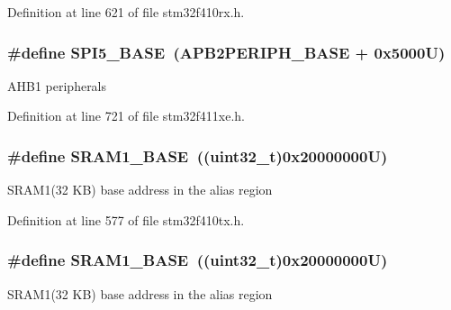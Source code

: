 Definition at line 621 of file stm32f410rx.\+h.

\subsubsection[{\texorpdfstring{S\+P\+I5\+\_\+\+B\+A\+SE}{SPI5_BASE}}]{\setlength{\rightskip}{0pt plus 5cm}\#define S\+P\+I5\+\_\+\+B\+A\+SE~({\bf A\+P\+B2\+P\+E\+R\+I\+P\+H\+\_\+\+B\+A\+SE} + 0x5000\+U)}\hypertarget{group___peripheral__registers__structures_gac1c58d33414e167d478ecd0e31331dfa}{}\label{group___peripheral__registers__structures_gac1c58d33414e167d478ecd0e31331dfa}
A\+H\+B1 peripherals 

Definition at line 721 of file stm32f411xe.\+h.

\subsubsection[{\texorpdfstring{S\+R\+A\+M1\+\_\+\+B\+A\+SE}{SRAM1_BASE}}]{\setlength{\rightskip}{0pt plus 5cm}\#define S\+R\+A\+M1\+\_\+\+B\+A\+SE~((uint32\+\_\+t)0x20000000\+U)}\hypertarget{group___peripheral__registers__structures_ga7d0fbfb8894012dbbb96754b95e562cd}{}\label{group___peripheral__registers__structures_ga7d0fbfb8894012dbbb96754b95e562cd}
S\+R\+A\+M1(32 K\+B) base address in the alias region 

Definition at line 577 of file stm32f410tx.\+h.

\subsubsection[{\texorpdfstring{S\+R\+A\+M1\+\_\+\+B\+A\+SE}{SRAM1_BASE}}]{\setlength{\rightskip}{0pt plus 5cm}\#define S\+R\+A\+M1\+\_\+\+B\+A\+SE~((uint32\+\_\+t)0x20000000\+U)}\hypertarget{group___peripheral__registers__structures_ga7d0fbfb8894012dbbb96754b95e562cd}{}\label{group___peripheral__registers__structures_ga7d0fbfb8894012dbbb96754b95e562cd}
S\+R\+A\+M1(32 K\+B) base address in the alias region 


